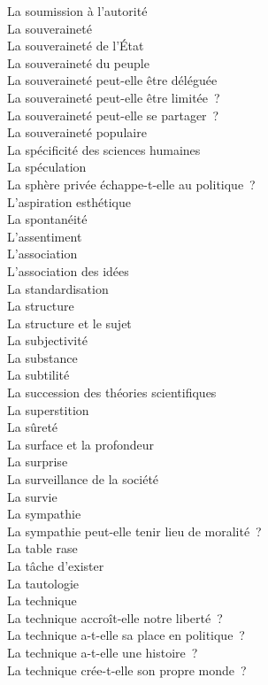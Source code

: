 \documentclass[a4paper,12pt]{article}
\begin{document}
La soumission à l'autorité \\
La souveraineté \\
La souveraineté de l'État \\
La souveraineté du peuple \\
La souveraineté peut-elle être déléguée \\
La souveraineté peut-elle être limitée ? \\
La souveraineté peut-elle se partager ? \\
La souveraineté populaire \\
La spécificité des sciences humaines \\
La spéculation \\
La sphère privée échappe-t-elle au politique ? \\
L'aspiration esthétique \\
La spontanéité \\
L'assentiment \\
L'association \\
L'association des idées \\
La standardisation \\
La structure \\
La structure et le sujet \\
La subjectivité \\
La substance \\
La subtilité \\
La succession des théories scientifiques \\
La superstition \\
La sûreté \\
La surface et la profondeur \\
La surprise \\
La surveillance de la société \\
La survie \\
La sympathie \\
La sympathie peut-elle tenir lieu de moralité ? \\
La table rase \\
La tâche d'exister \\
La tautologie \\
La technique \\
La technique accroît-elle notre liberté ? \\
La technique a-t-elle sa place en politique ? \\
La technique a-t-elle une histoire ? \\
La technique crée-t-elle son propre monde ? \\
\end{document}
